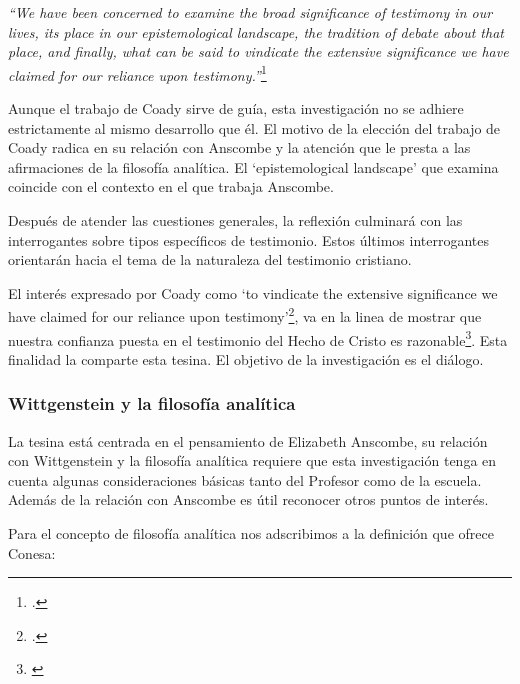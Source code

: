 \documentclass[11pt]{article}
\begin{document}
\emph{``We have been concerned to examine the broad significance of testimony in our lives, its place in our epistemological landscape, the tradition of debate about that place, and finally, what can be said to vindicate the extensive significance we have claimed for our reliance upon testimony.''}\footcite[175]{testcoady}

Aunque el trabajo de Coady sirve de guía, esta investigación no se adhiere estrictamente al mismo desarrollo que él. El motivo de la elección del trabajo de Coady radica en su relación con Anscombe y la atención que le presta a las afirmaciones de la filosofía analítica. El `epistemological landscape' que examina coincide con el contexto en el que trabaja Anscombe.
 
Después de atender las cuestiones generales, la reflexión culminará con las interrogantes sobre tipos específicos de testimonio. Estos últimos interrogantes orientarán hacia el tema de la naturaleza del testimonio cristiano.

El interés expresado por Coady como `to vindicate the extensive significance we have claimed for our reliance upon testimony'\footcite{testcoady}, va en la linea de mostrar que nuestra confianza puesta en el testimonio del Hecho de Cristo es razonable\footnote{\cite[267]{pradesmulticr}}. Esta finalidad la comparte esta tesina. El objetivo de la investigación es el diálogo.

\subsubsection{Wittgenstein y la filosofía analítica}

La tesina está centrada en el pensamiento de Elizabeth Anscombe, su relación con Wittgenstein y la filosofía analítica requiere que esta investigación tenga en cuenta algunas consideraciones básicas tanto del Profesor como de la escuela. Además de la relación con Anscombe es útil reconocer otros puntos de interés.

Para el concepto de filosofía analítica nos adscribimos a la definición que ofrece Conesa:
\end{document}
